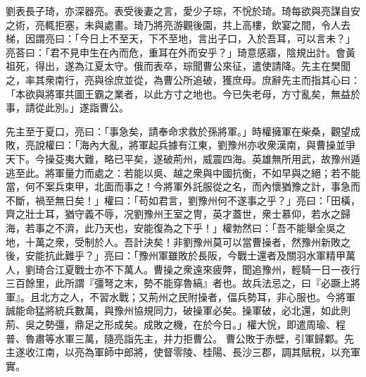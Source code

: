 \begin{pinyinscope}
 
劉表長子琦，亦深器亮。表受後妻之言，愛少子琮，不恱於琦。琦每欲與亮謀自安之術，亮輒拒塞，未與處畫。琦乃將亮游觀後園，共上高樓，飲宴之間，令人去梯，因謂亮曰：「今日上不至天，下不至地，言出子口，入於吾耳，可以言未？」亮荅曰：「君不見申生在內而危，重耳在外而安乎？」琦意感寤，陰規出計。會黃祖死，得出，遂為江夏太守。俄而表卒，琮聞曹公來征，遣使請降。先主在樊聞之，率其衆南行，亮與徐庶並從，為曹公所追破，獲庶母。庶辭先主而指其心曰：「本欲與將軍共圖王霸之業者，以此方寸之地也。今已失老母，方寸亂矣，無益於事，請從此別。」遂詣曹公。
 
 
先主至于夏口，亮曰：「事急矣，請奉命求救於孫將軍。」時權擁軍在柴桑，觀望成敗，亮說權曰：「海內大亂，將軍起兵據有江東，劉豫州亦收衆漢南，與曹操並爭天下。今操芟夷大難，略已平矣，遂破荊州，威震四海。英雄無所用武，故豫州遁逃至此。將軍量力而處之：若能以吳、越之衆與中國抗衡，不如早與之絕；若不能當，何不案兵束甲，北面而事之！今將軍外託服從之名，而內懷猶豫之計，事急而不斷，禍至無日矣！」權曰：「苟如君言，劉豫州何不遂事之乎？」亮曰：「田橫，齊之壯士耳，猶守義不辱，况劉豫州王室之冑，英才蓋世，衆士慕仰，若水之歸海，若事之不濟，此乃天也，安能復為之下乎！」權勃然曰：「吾不能舉全吳之地，十萬之衆，受制於人。吾計決矣！非劉豫州莫可以當曹操者，然豫州新敗之後，安能抗此難乎？」亮曰：「豫州軍雖敗於長阪，今戰士還者及關羽水軍精甲萬人，劉琦合江夏戰士亦不下萬人。曹操之衆遠來疲弊，聞追豫州，輕騎一日一夜行三百餘里，此所謂『彊弩之末，勢不能穿魯縞』者也。故兵法忌之，曰『必蹶上將軍』。且北方之人，不習水戰；又荊州之民附操者，偪兵勢耳，非心服也。今將軍誠能命猛將統兵數萬，與豫州協規同力，破操軍必矣。操軍破，必北還，如此則荊、吳之勢彊，鼎足之形成矣。成敗之機，在於今日。」權大恱，即遣周瑜、程普、魯肅等水軍三萬，隨亮詣先主，并力拒曹公。
 曹公敗于赤壁，引軍歸鄴。先主遂收江南，以亮為軍師中郎將，使督零陵、桂陽、長沙三郡，調其賦稅，以充軍實。
 

\end{pinyinscope}
